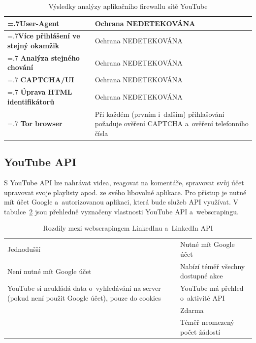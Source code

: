 \begin{table}[H]
\begin{tabularx}{\linewidth}{
    |>{\hsize=.7\hsize}X|>{\hsize=1.3\hsize}X|
  }
\hline

\textbf{User-Agent} & Ochrana NEDETEKOVÁNA \\
\hline
\textbf{Více přihlášení ve stejný okamžik} & Ochrana NEDETEKOVÁNA \\
\hline
\textbf{Analýza stejného chování} & Ochrana NEDETEKOVÁNA \\
\hline
\textbf{CAPTCHA/UI} & Ochrana NEDETEKOVÁNA \\
\hline
\textbf{Úprava HTML identifikátorů} & Ochrana NEDETEKOVÁNA \\
\hline
\textbf{Tor browser} & Při každém (prvním i~dalším) přihlašování požaduje ověření CAPTCHA a~ověření telefonního čísla \\
\hline
\end{tabularx}

\label{tab:YouTube_analyse}
\caption{Výsledky analýzy aplikačního firewallu sítě YouTube}
\end{table}

\subsection*{YouTube API}
S YouTube API lze nahrávat videa, reagovat na komentáře, spravovat svůj účet upravovat svoje playlisty apod. ze svého libovolné aplikace. Pro přístup je nutné mít účet Google a~autorizovanou aplikaci, která bude služeb API využívat. V tabulce~\ref{tab:YouTube_API_vs_webscraping} jsou přehledně vyznačeny vlastnosti YouTube API a~webscrapingu.

\begin{table}[H]
\begin{tabularx}{\linewidth}{
    |>{\hsize=1\hsize}X|>{\hsize=1\hsize}X|
  }
\hline

\multicolumn{1}{|c|}{\textbf{Webscraping}} & \multicolumn{1}{|c|}{\textbf{Twitter API}} \\ \hline
Jednodušší & Nutné mít Google účet \\ \hline
Není nutné mít Google účet & Nabízí téměř všechny dostupné akce \\ \hline
YouTube si neukládá data o~vyhledávání na server (pokud není použit Google účet), pouze do cookies & YouTube má přehled o~aktivitě API \\ \hline
 & Zdarma \\ \hline
 & Téměř neomezený počet žádostí \\ \hline
\end{tabularx}

\label{tab:YouTube_API_vs_webscraping}
\caption{Rozdíly mezi webscrapingem LinkedInu a~LinkedIn API}
\end{table}

